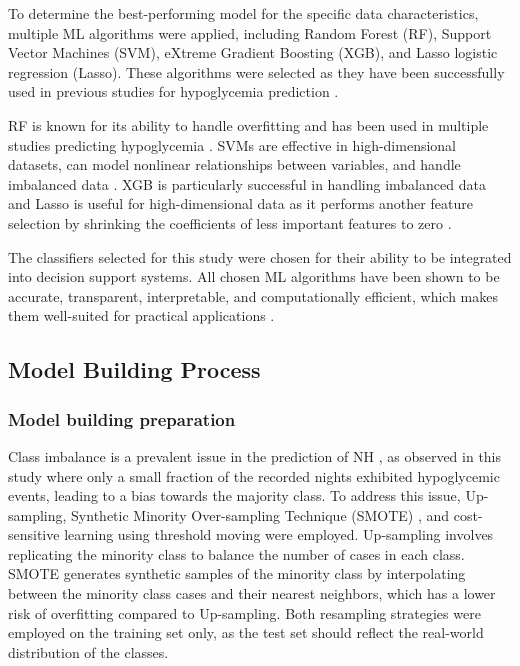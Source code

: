 To determine the best-performing model for the specific data characteristics, multiple ML algorithms were applied, including Random Forest (RF), Support Vector Machines (SVM), eXtreme Gradient Boosting (XGB), and Lasso logistic regression (Lasso). These algorithms were selected as they have been successfully used in previous studies for hypoglycemia prediction \cite{zhang2023data}.

RF is known for its ability to handle overfitting and has been used in multiple studies predicting hypoglycemia \cite{kodama2021ability,athey2019generalized}. SVMs are effective in high-dimensional datasets, can model nonlinear relationships between variables, and handle imbalanced data \cite{smola2004tutorial}. XGB is particularly successful in handling imbalanced data \cite{mujahid2021machine} and Lasso is useful for high-dimensional data as it performs another feature selection by shrinking the coefficients of less important features to zero \cite{kodama2021ability}.

The classifiers selected for this study were chosen for their ability to be integrated into decision support systems. All chosen ML algorithms have been shown to be accurate, transparent, interpretable, and computationally efficient, which makes them well-suited for practical applications \cite{mujahid2021machine, kodama2021ability}.

\subsection{Model Building Process} \label{Model Building Process}

\subsubsection{Model building preparation} \label{Feature category}
Class imbalance is a prevalent issue in the prediction of NH \cite{guemes2019predicting,parcerisas2022machine}, as observed in this study where only a small fraction of the recorded nights exhibited hypoglycemic events, leading to a bias towards the majority class. To address this issue, Up-sampling, Synthetic Minority Over-sampling Technique (SMOTE) \cite{chawla2002smote}, and cost-sensitive learning using threshold moving \cite{ling2008cost} were employed. Up-sampling involves replicating the minority class to balance the number of cases in each class. SMOTE generates synthetic samples of the minority class by interpolating between the minority class cases and their nearest neighbors, which has a lower risk of overfitting compared to Up-sampling. Both resampling strategies were employed on the training set only, as the test set should reflect the real-world distribution of the classes.

